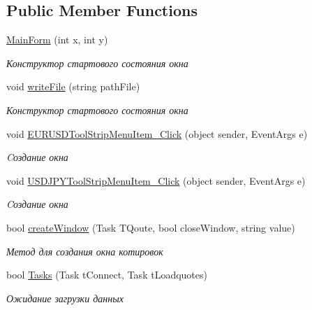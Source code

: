 \subsection*{Public Member Functions}
\begin{DoxyCompactItemize}
\item 
\hyperlink{class_client_1_1_main_form_a67c808fc65fba26e70e1e36dc083d131}{Main\+Form} (int x, int y)
\begin{DoxyCompactList}\small\item\em Конструктор стартового состояния окна \end{DoxyCompactList}\item 
void \hyperlink{class_client_1_1_main_form_a3200a9b853b787c11bc1fa2e974e472b}{write\+File} (string path\+File)
\begin{DoxyCompactList}\small\item\em Конструктор стартового состояния окна \end{DoxyCompactList}\item 
void \hyperlink{class_client_1_1_main_form_a736b03fd5ca2af0171db525573891553}{E\+U\+R\+U\+S\+D\+Tool\+Strip\+Menu\+Item\+\_\+\+Click} (object sender, Event\+Args e)
\begin{DoxyCompactList}\small\item\em Cоздание окна \end{DoxyCompactList}\item 
void \hyperlink{class_client_1_1_main_form_ae422739b1b0042a9b697ea2c446ac7c5}{U\+S\+D\+J\+P\+Y\+Tool\+Strip\+Menu\+Item\+\_\+\+Click} (object sender, Event\+Args e)
\begin{DoxyCompactList}\small\item\em Cоздание окна \end{DoxyCompactList}\item 
bool \hyperlink{class_client_1_1_main_form_acdcf3f02f06d2f0256c0d93411c6d4b1}{create\+Window} (Task T\+Qoute, bool close\+Window, string value)
\begin{DoxyCompactList}\small\item\em Метод для создания окна котировок \end{DoxyCompactList}\item 
bool \hyperlink{class_client_1_1_main_form_a48f67f872cf157e9be746823e1cba8e8}{Tasks} (Task t\+Connect, Task t\+Loadquotes)
\begin{DoxyCompactList}\small\item\em Ожидание загрузки данных \end{DoxyCompactList}\item 

\end{DoxyCompactItemize}
